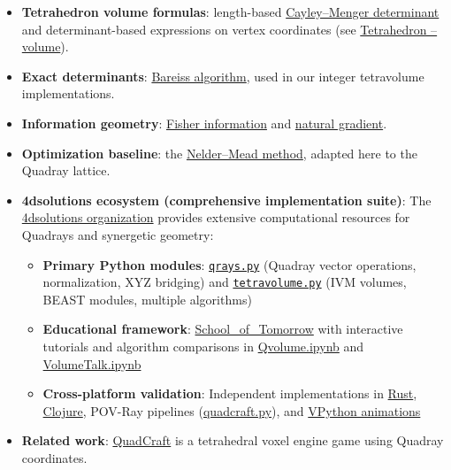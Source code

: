 \documentclass[
  10pt,
]{article}
\providecommand{\tightlist}{%
  \setlength{\itemsep}{0pt}\setlength{\parskip}{0pt}}
\begin{document}
\begin{itemize}
\tightlist
\item
  \textbf{Tetrahedron volume formulas}: length-based
  \href{https://en.wikipedia.org/wiki/Cayley\%E2\%80\%93Menger_determinant}{Cayley--Menger
  determinant} and determinant-based expressions on vertex coordinates
  (see
  \href{https://en.wikipedia.org/wiki/Tetrahedron\#Volume}{Tetrahedron
  -- volume}).
\item
  \textbf{Exact determinants}:
  \href{https://en.wikipedia.org/wiki/Bareiss_algorithm}{Bareiss
  algorithm}, used in our integer tetravolume implementations.
\item
  \textbf{Information geometry}:
  \href{https://en.wikipedia.org/wiki/Fisher_information}{Fisher
  information} and
  \href{https://en.wikipedia.org/wiki/Natural_gradient}{natural
  gradient}.
\item
  \textbf{Optimization baseline}: the
  \href{https://en.wikipedia.org/wiki/Nelder\%E2\%80\%93Mead_method}{Nelder--Mead
  method}, adapted here to the Quadray lattice.
\item
  \textbf{4dsolutions ecosystem (comprehensive implementation suite)}:
  The \href{https://github.com/4dsolutions}{4dsolutions organization}
  provides extensive computational resources for Quadrays and synergetic
  geometry:

  \begin{itemize}
  \tightlist
  \item
    \textbf{Primary Python modules}:
    \href{https://github.com/4dsolutions/m4w/blob/main/qrays.py}{\texttt{qrays.py}}
    (Quadray vector operations, normalization, XYZ bridging) and
    \href{https://github.com/4dsolutions/m4w/blob/main/tetravolume.py}{\texttt{tetravolume.py}}
    (IVM volumes, BEAST modules, multiple algorithms)
  \item
    \textbf{Educational framework}:
    \href{https://github.com/4dsolutions/School_of_Tomorrow}{School\_of\_Tomorrow}
    with interactive tutorials and algorithm comparisons in
    \href{https://github.com/4dsolutions/School_of_Tomorrow/blob/master/Qvolume.ipynb}{Qvolume.ipynb}
    and
    \href{https://github.com/4dsolutions/School_of_Tomorrow/blob/master/VolumeTalk.ipynb}{VolumeTalk.ipynb}
  \item
    \textbf{Cross-platform validation}: Independent implementations in
    \href{https://github.com/4dsolutions/rusty_rays}{Rust},
    \href{https://github.com/4dsolutions/synmods}{Clojure}, POV-Ray
    pipelines
    (\href{https://github.com/4dsolutions/School_of_Tomorrow/blob/master/quadcraft.py}{quadcraft.py}),
    and \href{https://github.com/4dsolutions/BookCovers}{VPython
    animations}
  \end{itemize}
\item
  \textbf{Related work}:
  \href{https://github.com/docxology/quadcraft/}{QuadCraft} is a
  tetrahedral voxel engine game using Quadray coordinates.
\end{itemize}
\end{document}
